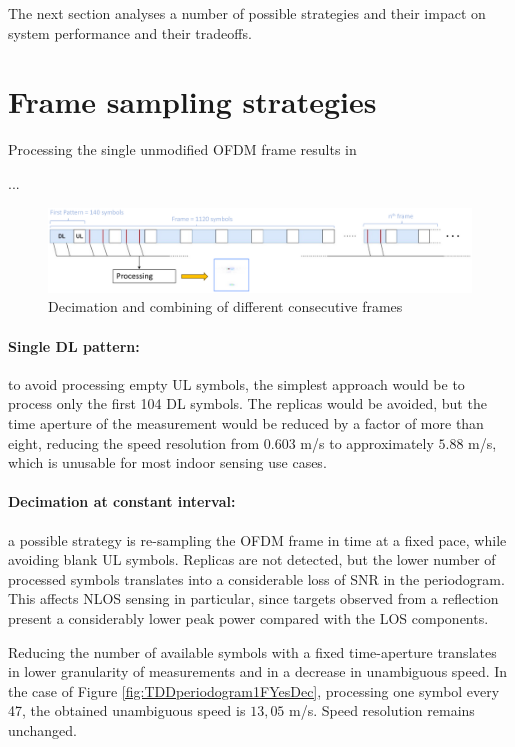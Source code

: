 	The next section analyses a number of possible strategies and their impact on system performance and their tradeoffs.    

\section{Frame sampling strategies}

	Processing the single unmodified OFDM frame results in 
	
	...

    \begin{figure}[H]
        \centering
        \includegraphics[width=1\textwidth]{Images/TDDprocessing/TDDstrategies.eps}
        \caption{Decimation and combining of different consecutive frames}
        \label{fig:TDDstrategies}
    \end{figure}

    \paragraph{Single DL pattern:}
    to avoid processing empty UL symbols, the simplest approach would be to process only the first 104 DL symbols. The replicas would be avoided, but the time aperture of the measurement would be reduced by a factor of more than eight, reducing the speed resolution from $0.603$ m/s to approximately $5.88$ m/s, which is unusable for most indoor sensing use cases.
    
    \paragraph{Decimation at constant interval:}
     a possible strategy is re-sampling the OFDM frame in time at a fixed pace, while avoiding blank UL symbols. Replicas are not detected, but the lower number of processed symbols translates into a considerable loss of SNR in the periodogram. This affects NLOS sensing in particular, since targets observed from a reflection present a considerably lower peak power compared with the LOS components.

     Reducing the number of available symbols with a fixed time-aperture translates in lower granularity of measurements and in a decrease in unambiguous speed. \protect\newline In the case of Figure \ref{fig:TDDperiodogram1FYesDec}, processing one symbol every 47, the obtained unambiguous speed is $13,05$ m/s. \protect\newline Speed resolution remains unchanged.
    
